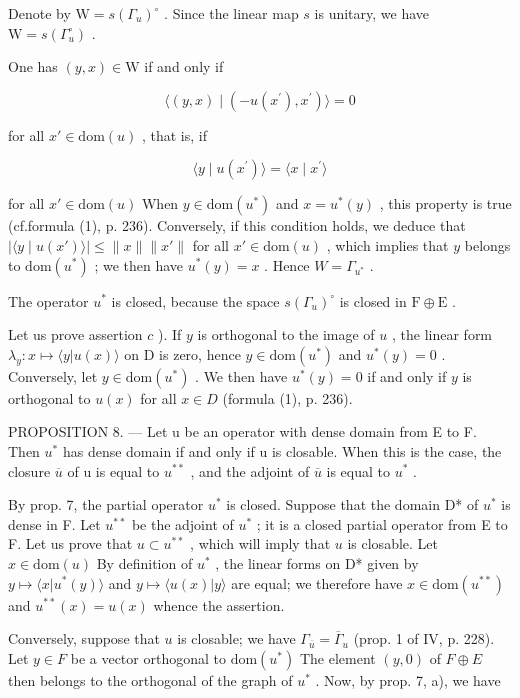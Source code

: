 Denote by \(\mathrm{W} = s(\Gamma_u)^\circ\) . Since the linear map \(s\) is unitary, we have \(\mathrm{W} = s(\Gamma_u^\circ)\) .

One has \((y,x)\in \mathrm{W}\) if and only if

\[
\langle (y, x) \mid (- u (x ^ {\prime}), x ^ {\prime}) \rangle = 0
\]

for all \(x' \in \mathrm{dom}(u)\) , that is, if

\[
\langle y \mid u (x ^ {\prime}) \rangle = \langle x \mid x ^ {\prime} \rangle
\]

for all \(x' \in \text{dom}(u)\) When \(y \in \text{dom}(u^{*})\) and \(x = u^{*}(y)\) , this property is true (cf.formula (1), p. 236). Conversely, if this condition holds, we deduce that \(|\langle y \mid u(x') \rangle| \leqslant \|x\| \|x'\|\) for all \(x' \in \text{dom}(u)\) , which implies that \(y\) belongs to \(\text{dom}(u^*)\) ; we then have \(u^*(y) = x\) . Hence \(W = \Gamma_{u^*}\) .

The operator \(u^{*}\) is closed, because the space \(s(\Gamma_{u})^{\circ}\) is closed in \(\mathrm{F} \oplus \mathrm{E}\) .

Let us prove assertion \(c\) ). If \(y\) is orthogonal to the image of \(u\) , the linear form \(\lambda_y: x \mapsto \langle y | u(x) \rangle\) on D is zero, hence \(y \in \text{dom}(u^*)\) and \(u^*(y) = 0\) . Conversely, let \(y \in \text{dom}(u^*)\) . We then have \(u^*(y) = 0\) if and only if \(y\) is orthogonal to \(u(x)\) for all \(x \in D\) (formula (1), p. 236).

PROPOSITION 8. --- Let u be an operator with dense domain from E to F. Then \(u^{*}\) has dense domain if and only if u is closable. When this is the case, the closure \(\overline{u}\) of u is equal to \(u^{**}\) , and the adjoint of \(\overline{u}\) is equal to \(u^{*}\) .

By prop. 7, the partial operator \(u^*\) is closed. Suppose that the domain D* of \(u^*\) is dense in F. Let \(u^{**}\) be the adjoint of \(u^*\) ; it is a closed partial operator from E to F. Let us prove that \(u \subset u^{**}\) , which will imply that \(u\) is closable. Let \(x \in \text{dom}(u)\) By definition of \(u^*\) , the linear forms on D* given by \(y \mapsto \langle x | u^*(y) \rangle\) and \(y \mapsto \langle u(x) | y \rangle\) are equal; we therefore have \(x \in \text{dom}(u^{**})\) and \(u^{**}(x) = u(x)\) whence the assertion.

Conversely, suppose that \(u\) is closable; we have \(\Gamma_{\overline{u}} = \overline{\Gamma}_u\) (prop. 1 of IV, p. 228). Let \(y \in F\) be a vector orthogonal to \(\mathrm{dom}(u^*)\) The element \((y,0)\) of \(F \oplus E\) then belongs to the orthogonal of the graph of \(u^*\) . Now, by prop. 7, a), we have

